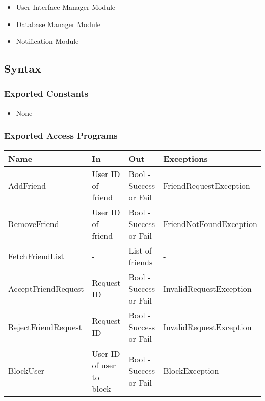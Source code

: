 \documentclass[12pt, titlepage]{article}
\begin{document}
\begin{itemize}
  \item User Interface Manager Module
  \item Database Manager Module
  \item Notification Module
\end{itemize}

\subsection{Syntax}

\subsubsection{Exported Constants}

\begin{itemize}
  \item None
\end{itemize}

\subsubsection{Exported Access Programs}

\begin{center}
  \begin{tabular}{p{4cm} p{4cm} p{4cm} p{4cm}}
    \hline
    \textbf{Name}       & \textbf{In}              & \textbf{Out}           & \textbf{Exceptions}     \\
    \hline
    AddFriend           & User ID of friend        & Bool - Success or Fail & FriendRequestException  \\
    \hline
    RemoveFriend        & User ID of friend        & Bool - Success or Fail & FriendNotFoundException \\
    \hline
    FetchFriendList     & -                        & List of friends        & -                       \\
    \hline
    AcceptFriendRequest & Request ID               & Bool - Success or Fail & InvalidRequestException \\
    \hline
    RejectFriendRequest & Request ID               & Bool - Success or Fail & InvalidRequestException \\
    \hline
    BlockUser           & User ID of user to block & Bool - Success or Fail & BlockException          \\
    \hline
  \end{tabular}
\end{center}
\end{document}
